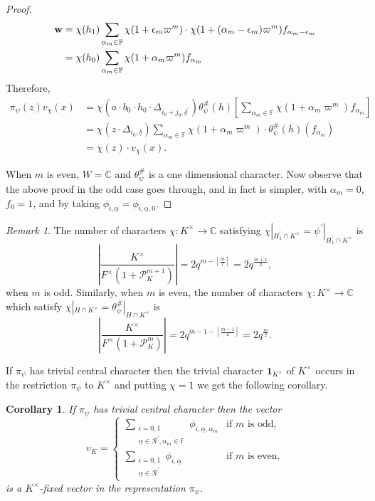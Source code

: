 \documentclass[12pt]{amsart}
\newtheorem{corollary}[theorem]{Corollary}%
\theoremstyle{definition}
\theoremstyle{remark}
\newtheorem{remark}{Remark}
\begin{document}
\begin{proof}
\begin{align*}
{\bf w} &= \chi (h_1)  \sum\limits_{\alpha_m \in \mathbb F} \chi(1 + \epsilon_m \varpi^m) \cdot \chi (1 +(\alpha_m-\epsilon_m) \varpi^m) f_{\alpha_m-\epsilon_m} \\
&= \chi(h_0)  \sum\limits_{\alpha_m \in \mathbb F} \chi(1+\alpha_m \varpi^m)f_{\alpha_m}
\end{align*}
Therefore,
\begin{align*}		
\pi_\psi(z) v_{\chi}(x) &=   \chi \left(a \cdot b_0 \cdot h_0 \cdot \Delta_{ i_0 + j_0, \underline{\delta}^\prime}  \right) 
\theta_\psi^\#(h) \left[ \sum\limits_{\alpha_m \in \mathbb F} \chi(1+\alpha_m \varpi^m)f_{\alpha_m} \right]\\
&= \chi \left(z \cdot \Delta_{ i_0, \underline{\delta}}  \right) \sum\limits_{\alpha_m \in \mathbb F} \chi(1 + \alpha_m \varpi^m) \cdot \theta_\psi^\#(h)(f_{\alpha_m})  \\
&= \chi(z) \cdot v_\chi(x).
\end{align*}

When $m$ is even, $W = \mathbb C$ and $\theta_\psi^\#$ is a one dimensional character. Now observe that the above proof in the odd case goes through, and in fact is simpler, with $\alpha_m=0$, $f_0 = 1$, and by taking $\phi_{i,\underline{\alpha}} = \phi_{i,\underline{\alpha},0}$.   
\end{proof}

\begin{remark}\label{rmk4}
The number of characters $\chi: K^\times \rightarrow \mathbb C$ satisfying $\chi |_{H_1^\prime \cap K^\times} = \psi^\prime|_{H_1^\prime \cap K^\times}$ is 
\[\left| \frac{K^\times}{F^\times (1 + \mathcal P_K^{m +1} )}   \right| = 2q^{m-\left[\frac{m}{2} \right]} = 2q^\frac{m+1}{2}, \] when $m$ is odd. Similarly, when $m$ is even, the number of characters $\chi: K^\times \rightarrow \mathbb C$ which satisfy $\chi|_{H \cap K^\times} = \theta_\psi^\# |_{H \cap K^\times}$ is 
\[\left| \frac{K^\times}{F^\times (1 + \mathcal P_K^m )}  \right| = 2q^{m-1-\left[\frac{m-1}{2} \right]} = 2q^\frac{m}{2}.\]
\end{remark}

If $\pi_\psi$ has trivial central character then the trivial character $\textbf{1}_{K^\times}$ of $K^\times$ occurs in the restriction $\pi_\psi$ to $K^\times$ and putting $\chi=1$ we get the following corollary.

\begin{corollary}\label{cor4}
 If $\pi_\psi$ has trivial central character then the vector 
 \[v_K = \begin{cases}
 \sum\limits_{\substack{i=0,1 \\  \underline{\alpha} \in \mathcal{R}^\prime, \alpha_m \in \mathbb F }}   \phi_{i,\underline{\alpha}, \alpha_m}  &\text{if $m$ is odd,}  \\
\sum\limits_{\substack{i=0,1 \\  \underline{\alpha} \in \mathcal{R}^\prime  }} \phi_{i,\underline{\alpha}}  &\text{if $m$ is even,} 
\end{cases}\]
is a $K^\times$-fixed vector in the representation $\pi_\psi$.
\end{corollary}
\end{document}
